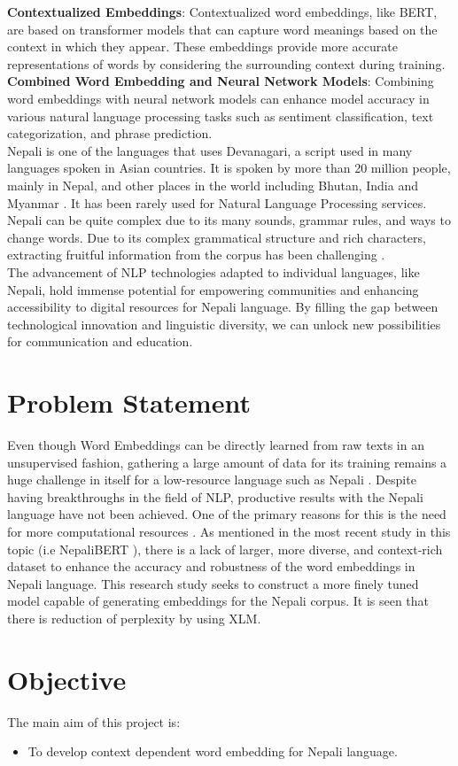\textbf{Contextualized Embeddings}:
Contextualized word embeddings, like BERT, are based on transformer models that can capture word meanings based on the context in which they appear.
These embeddings provide more accurate representations of words by considering the surrounding context during training. \\
\textbf{Combined Word Embedding and Neural Network Models}:
Combining word embeddings with neural network models can enhance model accuracy in various natural language processing tasks such as sentiment classification, text categorization, and phrase prediction. \\
Nepali is one of the languages that uses Devanagari, a script used in many languages spoken in Asian countries. It is spoken by more than 20 million people, mainly in Nepal, and other places in the world including Bhutan, India and Myanmar \cite{niraula2020linguistic}.  It has been rarely used for Natural Language Processing services.  Nepali can be quite complex due to its many sounds, grammar rules, and ways to change words. Due to its complex grammatical structure and rich characters, extracting fruitful information from the corpus has been challenging \cite{NepaliBERT}.\\
The advancement of NLP technologies adapted to individual languages, like Nepali, hold immense potential for empowering communities and enhancing accessibility to digital resources for Nepali language. By filling the gap between technological innovation and linguistic diversity, we can unlock new possibilities for communication and education.\\
\section{Problem Statement} 
Even though Word Embeddings can be directly learned from raw texts in an unsupervised fashion, gathering a large amount of data for its training remains a huge challenge in itself for a low-resource language such as Nepali \cite{koirala-niraula-2021-npvec1}. Despite having breakthroughs in the field of NLP, productive results with the Nepali language have not been achieved. One of the primary reasons for this is the need for more computational resources \cite{NepaliBERT}. As mentioned in the most recent study in this topic (i.e NepaliBERT \cite{NepaliBERT}), there is a lack of larger, more diverse, and context-rich dataset to enhance the accuracy and robustness of the word embeddings in Nepali language. This research study seeks to construct a more finely tuned model capable of generating embeddings for the Nepali corpus. It is seen that there is reduction of perplexity by using XLM.
\section{Objective}
    The main aim of this project is:
    \begin{itemize}
        \item To develop context dependent word embedding for Nepali language.
    \end{itemize}

